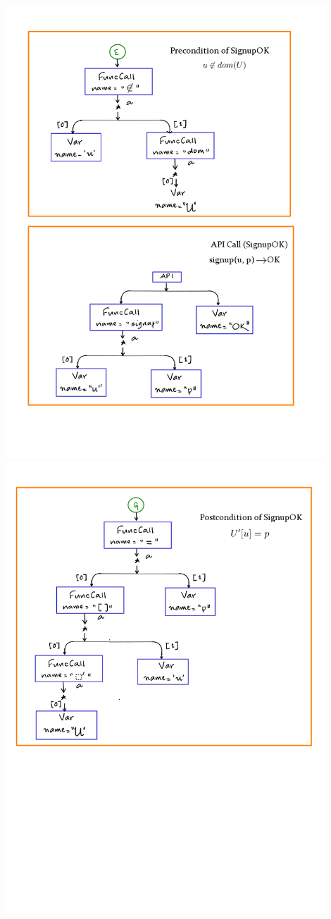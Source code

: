 \documentclass[12pts, a4paper]{article}
\begin{document}
\begin{center}
\includegraphics[width=0.9\textwidth]{../images/spec-AST-5.png}
\includegraphics[width=0.9\textwidth]{../images/spec-AST-6.png}

\end{center}
\end{document}
